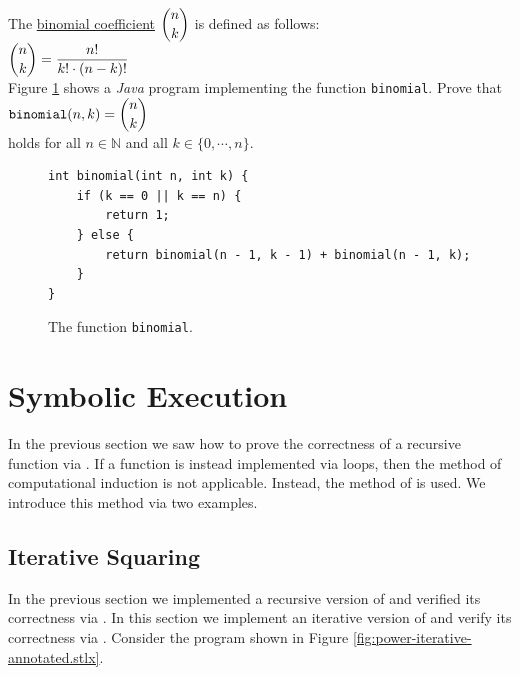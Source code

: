 \exerciseEng
The \href{https://en.wikipedia.org/wiki/Binomial_coefficient}{binomial coefficient} $\displaystyle {n \choose k}$ is defined as follows:
\\[0.2cm]
\hspace*{1.3cm}
$\displaystyle {n \choose k} = \frac{n!}{k! \cdot (n-k)!}$
\\[0.2cm]
Figure \ref{fig:binomial} shows a \textsl{Java} program implementing the function \texttt{binomial}.  Prove
that 
\\[0.2cm]
\hspace*{1.3cm}
$\displaystyle \mathtt{binomial}(n, k) = {n \choose k}$
\\[0.2cm]
holds for all $n \in \mathbb{N}$ and all $k \in \{ 0, \cdots, n \}$. \eox

\begin{figure}[!ht]
\centering
\begin{verbatim}
int binomial(int n, int k) {
    if (k == 0 || k == n) {
        return 1;
    } else {
        return binomial(n - 1, k - 1) + binomial(n - 1, k);
    }
}
\end{verbatim}
\vspace*{-0.3cm}
\caption{The function \texttt{binomial}.}
\label{fig:binomial}
\end{figure}



\section{Symbolic Execution}
In the previous section we saw how to prove the correctness of a recursive function via
.  If a function is instead implemented via loops,
then the method of computational induction is not applicable.   Instead, the method of 
  is used.
We introduce this method via two examples.

\subsection{Iterative Squaring}
In the previous section we implemented a recursive version of  and verified its
correctness via .  In this section we implement an iterative version of
 and verify its correctness via .
Consider the program shown in Figure \ref{fig:power-iterative-annotated.stlx}. 

